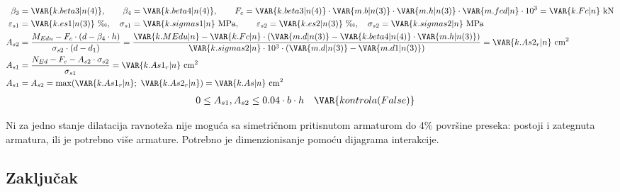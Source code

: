 \begin{align*}
\beta_3 &= \VAR{k.beta3|n(4)}, \qquad \beta_4 = \VAR{k.beta4|n(4)}, \qquad F_c = \VAR{k.beta3|n(4)} \cdot \VAR{m.b|n(3)} \cdot \VAR{m.h|n(3)} \cdot \VAR{m.fcd|n} \cdot 10^3 = \VAR{k.Fc|n} \ \mathrm{kN} \\
\varepsilon_{s1} &= \VAR{k.es1|n(3)} \ \text{‰}, \quad \sigma_{s1} = \VAR{k.sigmas1|n} \ \mathrm{MPa}, \qquad \varepsilon_{s2} = \VAR{k.es2|n(3)} \ \text{‰}, \quad \sigma_{s2} = \VAR{k.sigmas2|n} \ \mathrm{MPa} \\
A_{s2} &= \frac{M_{Edu} - F_c \cdot (d - \beta_4 \cdot h)}{\sigma_{s2} \cdot (d - d_1)} = \frac{\VAR{k.MEdu|n} - \VAR{k.Fc|n} \cdot (\VAR{m.d|n(3)} - \VAR{k.beta4|n(4)} \cdot \VAR{m.h|n(3)})}{\VAR{k.sigmas2|n} \cdot 10^3 \cdot (\VAR{m.d|n(3)} - \VAR{m.d1|n(3)})} = \VAR{k.As2_r|n} \ \mathrm{cm^2} \\
A_{s1} &= \frac{N_{Ed} - F_c - A_{s2} \cdot \sigma_{s2}}{\sigma_{s1}} = \VAR{k.As1_r|n} \ \mathrm{cm^2} \\
A_{s1} &= A_{s2} = \max(\VAR{k.As1_r|n};\ \VAR{k.As2_r|n}) = \VAR{k.As|n} \ \mathrm{cm^2}
\end{align*}
\begin{align*}
0 \leq A_{s1}, A_{s2} &\leq 0.04 \cdot b \cdot h \quad \VAR{kontrola(False)}
\end{align*}

Ni za jedno stanje dilatacija ravnoteža nije moguća sa simetričnom pritisnutom armaturom do 4\% površine preseka: postoji i zategnuta armatura, ili je potrebno više armature. Potrebno je dimenzionisanje pomoću dijagrama interakcije.

\subsection{Zaključak}

